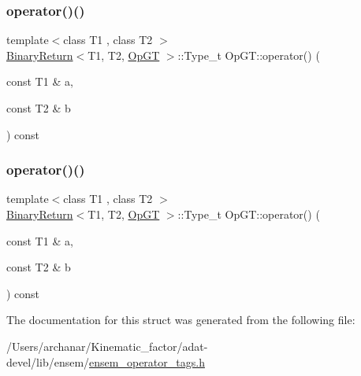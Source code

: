 \mbox{\label{structOpGT_a8571b221a0c893055b34bdfbd8922fd4}} 
\subsubsection{\texorpdfstring{operator()()}{operator()()}\hspace{0.1cm}{\footnotesize\ttfamily [2/3]}}
{\footnotesize\ttfamily template$<$class T1 , class T2 $>$ \\
\mbox{\hyperlink{structBinaryReturn}{Binary\+Return}}$<$T1, T2, \mbox{\hyperlink{structOpGT}{Op\+GT}} $>$\+::Type\+\_\+t Op\+G\+T\+::operator() (\begin{DoxyParamCaption}\item[{const T1 \&}]{a,  }\item[{const T2 \&}]{b }\end{DoxyParamCaption}) const\hspace{0.3cm}{\ttfamily [inline]}}

\mbox{\label{structOpGT_a8571b221a0c893055b34bdfbd8922fd4}} 
\subsubsection{\texorpdfstring{operator()()}{operator()()}\hspace{0.1cm}{\footnotesize\ttfamily [3/3]}}
{\footnotesize\ttfamily template$<$class T1 , class T2 $>$ \\
\mbox{\hyperlink{structBinaryReturn}{Binary\+Return}}$<$T1, T2, \mbox{\hyperlink{structOpGT}{Op\+GT}} $>$\+::Type\+\_\+t Op\+G\+T\+::operator() (\begin{DoxyParamCaption}\item[{const T1 \&}]{a,  }\item[{const T2 \&}]{b }\end{DoxyParamCaption}) const\hspace{0.3cm}{\ttfamily [inline]}}



The documentation for this struct was generated from the following file\+:\begin{DoxyCompactItemize}
\item 
/\+Users/archanar/\+Kinematic\+\_\+factor/adat-\/devel/lib/ensem/\mbox{\hyperlink{adat-devel_2lib_2ensem_2ensem__operator__tags_8h}{ensem\+\_\+operator\+\_\+tags.\+h}}\end{DoxyCompactItemize}
